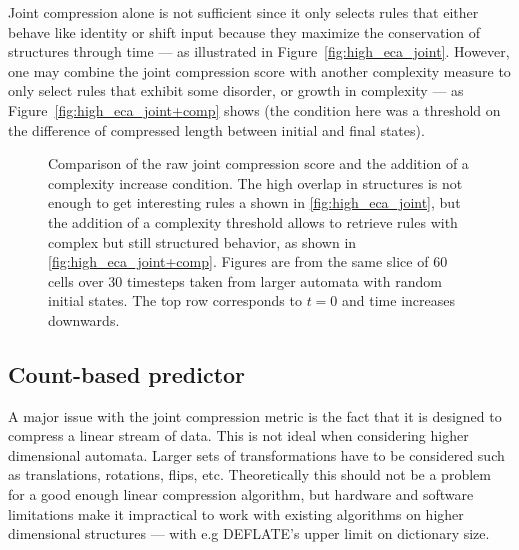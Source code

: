 Joint compression alone is not sufficient since it only selects rules that
either behave like identity or shift input because they maximize the
conservation of structures through time --- as illustrated in
Figure~\ref{fig:high_eca_joint}. However, one may combine the joint compression
score with another complexity measure to only select rules that exhibit some
disorder, or growth in complexity --- as Figure~\ref{fig:high_eca_joint+comp}
shows (the condition here was a threshold on the difference of compressed length
between initial and final states).

\begin{figure}[htbp]
  \centering
  \hfil
  \caption{Comparison of the raw joint compression score and the addition of a
    complexity increase condition. The high overlap in structures is not enough
    to get interesting rules a shown in \ref{fig:high_eca_joint}, but the
    addition of a complexity threshold allows to retrieve rules with complex but
    still structured behavior, as shown in \ref{fig:high_eca_joint+comp}.
    Figures are from the same slice of 60 cells over 30 timesteps taken from
    larger automata with random initial states. The top row corresponds to $t =
    0$ and time increases downwards.}
  \label{fig:joint_highest}
\end{figure}

\subsection{Count-based predictor}\label{sec:count-based-pred}

A major issue with the joint compression metric is the fact that it is designed
to compress a linear stream of data. This is not ideal when considering higher
dimensional automata. Larger sets of transformations have to be
considered such as translations, rotations, flips, etc. Theoretically this
should not be a problem for a good enough linear compression algorithm, but
hardware and software limitations make it impractical to work with existing
algorithms on higher dimensional structures --- with e.g DEFLATE's upper limit
on dictionary size.

